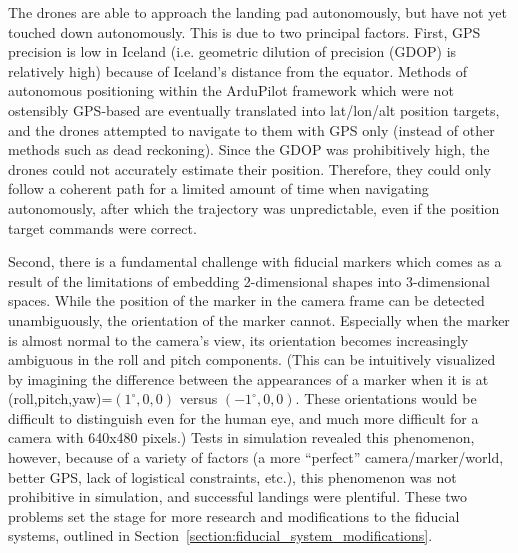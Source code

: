 The drones are able to approach the landing pad autonomously,
but have not yet touched down autonomously.
This is due to two principal factors.
First, GPS precision is low in Iceland (i.e. geometric dilution of precision (GDOP) is relatively high)
because of Iceland's distance from the equator.
Methods of autonomous positioning within the ArduPilot framework which were not ostensibly GPS-based
are eventually translated into lat/lon/alt position targets,
and the drones attempted to navigate to them with GPS only (instead of other methods such as dead reckoning).
Since the GDOP was prohibitively high, the drones could not accurately estimate their position.
Therefore, they could only follow a coherent path for a limited amount of time when navigating autonomously,
after which the trajectory was unpredictable, even if the position target commands were correct.

Second, there is a fundamental challenge with fiducial markers
which comes as a result of the limitations of embedding 2-dimensional shapes into 3-dimensional spaces.
While the position of the marker in the camera frame can be detected unambiguously,
the orientation of the marker cannot.
Especially when the marker is almost normal to the camera's view,
its orientation becomes increasingly ambiguous in the roll and pitch components.
(This can be intuitively visualized by imagining the difference between the appearances of a marker
when it is at (roll,pitch,yaw)=$(1^{\circ}, 0, 0)$ versus $(-1^{\circ}, 0, 0)$.
These orientations would be difficult to distinguish even for the human eye, and much more difficult
for a camera with 640x480 pixels.)
Tests in simulation revealed this phenomenon, however, because of a variety of factors
(a more ``perfect'' camera/marker/world, better GPS, lack of logistical constraints, etc.),
this phenomenon was not prohibitive in simulation, and successful landings were plentiful.
These two problems set the stage for more research and modifications to the fiducial systems,
outlined in Section~\ref{section:fiducial_system_modifications}.